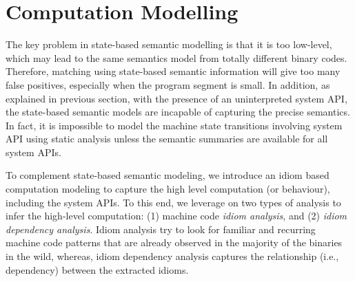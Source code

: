 
\section{Computation Modelling} \label{subsec:abs_sem_mod}
The key problem in state-based semantic modelling is that it is too low-level, which may lead to the same semantics model from totally different binary codes.
Therefore, matching using state-based semantic information will give too many false positives, especially when the program segment is small.
In addition, as explained in previous section, with the presence of an uninterpreted system API, the state-based semantic models are incapable of capturing the precise semantics. In fact, it is impossible to model the machine state transitions involving system API using static analysis unless the semantic summaries are available for all system APIs.

To complement state-based semantic modeling, we introduce an idiom based computation modeling to capture the high level computation (or behaviour), including the system APIs.
To this end, we leverage on two types of analysis to infer the high-level computation: (1) machine code \textit{idiom analysis}, and (2) \textit{idiom dependency analysis}. Idiom analysis try to look for familiar and recurring machine code patterns that are already observed in the majority of the binaries in the wild, whereas, idiom dependency analysis captures the relationship (i.e., dependency) between the extracted idioms.


